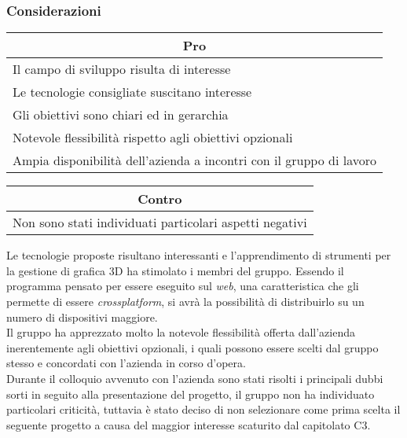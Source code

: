 \subsubsection{Considerazioni}
\begin{minipage}[t]{0.45\linewidth}
    \vspace{0pt}
    {\renewcommand{\arraystretch}{1.5}
    \begin{tabular}{p{1\linewidth}}
        \multicolumn{1}{c}{\textbf{Pro}} \\
        \midrule
		Il campo di sviluppo risulta di interesse \\
		Le tecnologie consigliate suscitano interesse \\
		Gli obiettivi sono chiari ed in gerarchia \\
		Notevole flessibilità rispetto agli obiettivi opzionali \\
		Ampia disponibilità dell'azienda a incontri con il gruppo di lavoro \\
        \hline
    \end{tabular}
    }
\end{minipage}
\hspace{0.05\linewidth}
\begin{minipage}[t]{0.45\linewidth}
    \vspace{0pt}
    {\renewcommand{\arraystretch}{1.5}
    \begin{tabular}{p{1\linewidth}}
        \multicolumn{1}{c}{\textbf{Contro}} \\
        \midrule
        Non sono stati individuati particolari aspetti negativi \\
        \hline
    \end{tabular}
    }
\end{minipage}
\vspace{1em}

\noindent
Le tecnologie proposte risultano interessanti e l'apprendimento di strumenti per la gestione di grafica 3D ha stimolato i membri del gruppo.
Essendo il programma pensato per essere eseguito sul \textit{web}, una caratteristica che gli permette di essere \textit{crossplatform}, si avrà la possibilità di distribuirlo su un numero di dispositivi maggiore.\\
Il gruppo ha apprezzato molto la notevole flessibilità offerta dall'azienda inerentemente agli obiettivi opzionali, i quali possono essere scelti dal gruppo stesso e concordati con l'azienda in corso d'opera.\\
Durante il colloquio avvenuto con l'azienda sono stati risolti i principali dubbi sorti in seguito alla presentazione del progetto, il gruppo non ha individuato particolari criticità, tuttavia è stato deciso di non selezionare come prima scelta il seguente progetto a causa del maggior interesse scaturito dal capitolato C3.